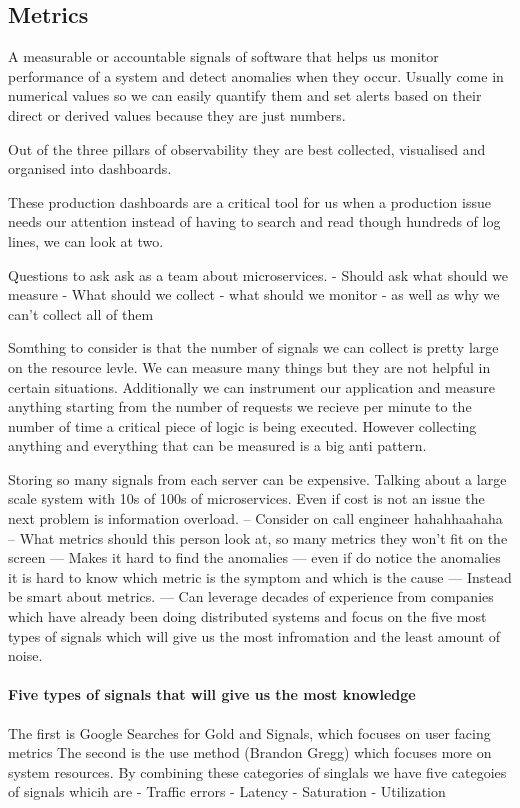 \documentclass[a4paper, 11pt]{book}
\begin{document}
{    \subsection{Metrics}
    A measurable or accountable signals of software that helps us monitor performance of a system and detect anomalies when they occur.
    Usually come in numerical values so we can easily quantify them and set alerts based on their direct or derived values because they are just numbers.

    Out of the three pillars of observability they are best collected, visualised and organised into dashboards.

    These production dashboards are a critical tool for us when a production issue needs our attention instead of having to search and read though hundreds of log lines, we can look at two.

    Questions to ask ask as a team about microservices.
    - Should ask what should we measure
    - What should we collect
    - what should we monitor
    - as well as why we can't collect all of them

    Somthing to consider is that the number of signals we can collect is pretty large on the resource levle.
    We can measure many things but they are not helpful in certain situations.
    Additionally we can instrument our application and measure anything starting from the number of requests we recieve per minute to the number of time a critical piece of logic is being executed.
    However collecting anything and everything that can be measured is a big anti pattern.

    Storing so many signals from each server can be expensive.
    Talking about a large scale system with 10s of 100s of microservices.
    Even if cost is not an issue the next problem is information overload.
    -- Consider on call engineer hahahhaahaha
    -- What metrics should this person look at, so many metrics they won't fit on the screen
    --- Makes it hard to find the anomalies
    --- even if do notice the anomalies it is hard to know which metric is the symptom and which is the cause
    --- Instead be smart about metrics.
    --- Can leverage decades of experience from companies which have already been doing distributed systems and focus on the five most types of signals which will give us the most infromation and the least amount of noise.

    \paragraph{Five types of signals that will give us the most knowledge}
    The first is Google Searches for Gold and Signals, which focuses on user facing metrics
    The second is the use method (Brandon Gregg) which focuses more on system resources.
    By combining these categories of singlals we have five categoies of signals whicih are
    - Traffic errors
    - Latency
    - Saturation
    - Utilization

}
\end{document}
